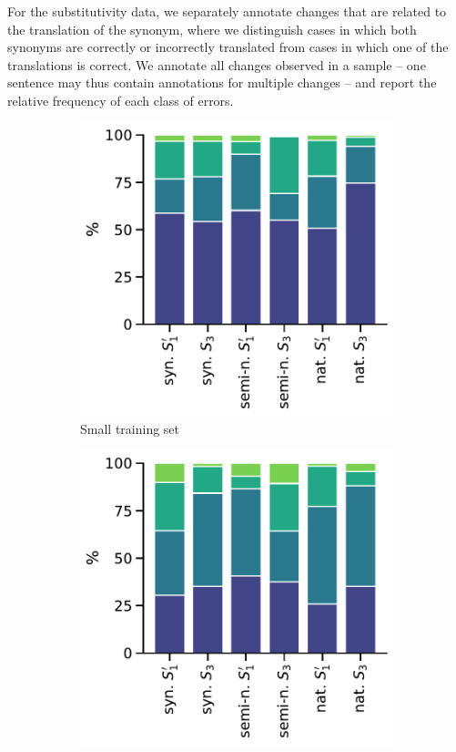 \noindent For the substitutivity data, we separately annotate changes that are related to the translation of the synonym, where we distinguish cases in which both synonyms are correctly or incorrectly translated from cases in which one of the translations is correct.
We annotate all changes observed in a sample -- one sentence may thus contain annotations for multiple changes -- and report the relative frequency of each class of errors.

\begin{figure}[h]\centering
\begin{subfigure}[b]{0.25\textwidth}
\includegraphics[width=\textwidth]{figures/analysis_appendix/systematicity_small.pdf}
\caption{Small training set}
\end{subfigure}
\begin{subfigure}[b]{0.25\textwidth}
\includegraphics[width=\textwidth]{figures/analysis_appendix/systematicity_medium.pdf}

\end{subfigure}
\end{figure}
